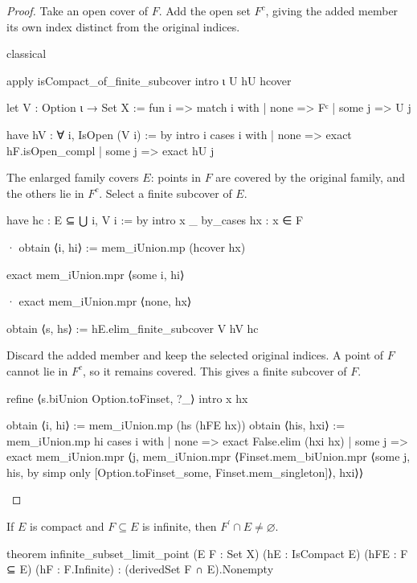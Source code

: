 \begin{proof}
  Take an open cover of $F$.
  Add the open set $F^{c}$, giving the added member its own index distinct from the original
  indices.

  \begin{lean}
    classical

    apply isCompact_of_finite_subcover
    intro ι U hU hcover

    let V : Option ι → Set X := fun i => match i with
      | none => Fᶜ
      | some j => U j

    have hV : ∀ i, IsOpen (V i) := by
      intro i
      cases i with
      | none => exact hF.isOpen_compl
      | some j => exact hU j
  \end{lean}

  The enlarged family covers $E$: points in $F$ are covered by the original family, and the others
  lie in $F^{c}$.
  Select a finite subcover of $E$.

  \begin{lean}
    have hc : E ⊆ ⋃ i, V i := by
      intro x _
      by_cases hx : x ∈ F

      · obtain ⟨i, hi⟩ := mem_iUnion.mp (hcover hx)

        exact mem_iUnion.mpr ⟨some i, hi⟩

      · exact mem_iUnion.mpr ⟨none, hx⟩

    obtain ⟨s, hs⟩ := hE.elim_finite_subcover V hV hc
  \end{lean}

  Discard the added member and keep the selected original indices.
  A point of $F$ cannot lie in $F^{c}$, so it remains covered.
  This gives a finite subcover of $F$.

  \begin{lean}
    refine ⟨s.biUnion Option.toFinset, ?_⟩
    intro x hx

    obtain ⟨i, hi⟩ := mem_iUnion.mp (hs (hFE hx))
    obtain ⟨his, hxi⟩ := mem_iUnion.mp hi
    cases i with
    | none => exact False.elim (hxi hx)
    | some j =>
      exact mem_iUnion.mpr ⟨j, mem_iUnion.mpr
        ⟨Finset.mem_biUnion.mpr
          ⟨some j, his, by simp only [Option.toFinset_some, Finset.mem_singleton]⟩, hxi⟩⟩
  \end{lean}

\end{proof}

\begin{theorem}
  \label{an1:thm:infinite-subset-of-compact-set-has-limit-point}
  If $E$ is compact and $F\subseteq E$ is infinite, then $F^{\prime}\cap E\ne\varnothing$.

  \begin{lean}
    theorem infinite_subset_limit_point (E F : Set X) (hE : IsCompact E)
        (hFE : F ⊆ E) (hF : F.Infinite) : (derivedSet F ∩ E).Nonempty
  \end{lean}
\end{theorem}

